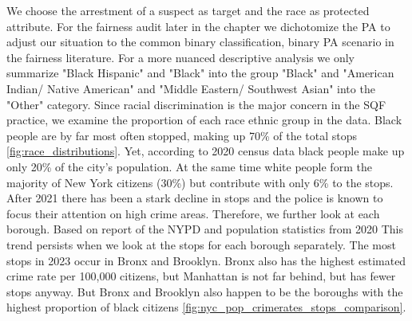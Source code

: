 We choose the arrestment of a suspect as target and the race as protected attribute. For the fairness audit later in the chapter we dichotomize the PA to adjust our situation to the common binary classification, binary PA scenario in the fairness literature. For a more nuanced descriptive analysis we only summarize "Black Hispanic" and "Black" into the group "Black" and  "American Indian/ Native American" and "Middle Eastern/ Southwest Asian" into the "Other" category.  
Since racial discrimination is the major concern in the SQF practice, we examine the proportion of each race ethnic group in the data. Black people are by far most often stopped, making up 70\% of the total stops \autoref{fig:race_distributions}. Yet, according to 2020 census data black people make up only 20\% of the city's population. At the same time white people form the majority of New York citizens (30\%) but contribute with only 6\% to the stops. 
After 2021 there has been a stark decline in stops and the police is known to focus their attention on high crime areas. Therefore, we further look at each borough. Based on report of the NYPD and population statistics from 2020 
This trend persists when we look at the stops for each borough separately. 
The most stops in 2023 occur in Bronx and Brooklyn. Bronx also has the highest estimated crime rate per 100,000 citizens, but Manhattan is not far behind, but has fewer stops anyway. But Bronx and Brooklyn also happen to be the boroughs with the highest proportion of black citizens \autoref{fig:nyc_pop_crimerates_stops_comparison}. 

